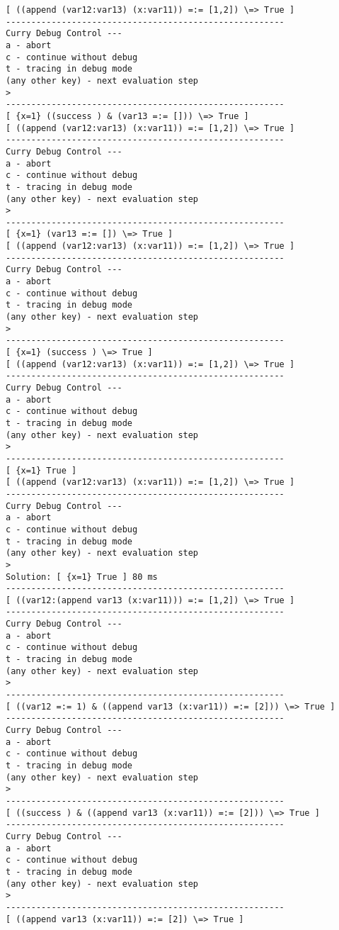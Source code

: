 \documentclass[titlepage,fleqn]{article}
\begin{document}
{\begin{verbatim}
[ ((append (var12:var13) (x:var11)) =:= [1,2]) \=> True ]
-------------------------------------------------------
Curry Debug Control ---
a - abort
c - continue without debug
t - tracing in debug mode
(any other key) - next evaluation step
>
-------------------------------------------------------
[ {x=1} ((success ) & (var13 =:= [])) \=> True ]
[ ((append (var12:var13) (x:var11)) =:= [1,2]) \=> True ]
-------------------------------------------------------
Curry Debug Control ---
a - abort
c - continue without debug
t - tracing in debug mode
(any other key) - next evaluation step
>
-------------------------------------------------------
[ {x=1} (var13 =:= []) \=> True ]
[ ((append (var12:var13) (x:var11)) =:= [1,2]) \=> True ]
-------------------------------------------------------
Curry Debug Control ---
a - abort
c - continue without debug
t - tracing in debug mode
(any other key) - next evaluation step
>
-------------------------------------------------------
[ {x=1} (success ) \=> True ]
[ ((append (var12:var13) (x:var11)) =:= [1,2]) \=> True ]
-------------------------------------------------------
Curry Debug Control ---
a - abort
c - continue without debug
t - tracing in debug mode
(any other key) - next evaluation step
>
-------------------------------------------------------
[ {x=1} True ]
[ ((append (var12:var13) (x:var11)) =:= [1,2]) \=> True ]
-------------------------------------------------------
Curry Debug Control ---
a - abort
c - continue without debug
t - tracing in debug mode
(any other key) - next evaluation step
> 
Solution: [ {x=1} True ] 80 ms
-------------------------------------------------------
[ ((var12:(append var13 (x:var11))) =:= [1,2]) \=> True ]
-------------------------------------------------------
Curry Debug Control ---
a - abort
c - continue without debug
t - tracing in debug mode
(any other key) - next evaluation step
>
-------------------------------------------------------
[ ((var12 =:= 1) & ((append var13 (x:var11)) =:= [2])) \=> True ]
-------------------------------------------------------
Curry Debug Control ---
a - abort
c - continue without debug
t - tracing in debug mode
(any other key) - next evaluation step
>
-------------------------------------------------------
[ ((success ) & ((append var13 (x:var11)) =:= [2])) \=> True ]
-------------------------------------------------------
Curry Debug Control ---
a - abort
c - continue without debug
t - tracing in debug mode
(any other key) - next evaluation step
>
-------------------------------------------------------
[ ((append var13 (x:var11)) =:= [2]) \=> True ]

\end{verbatim}}
\end{document}
